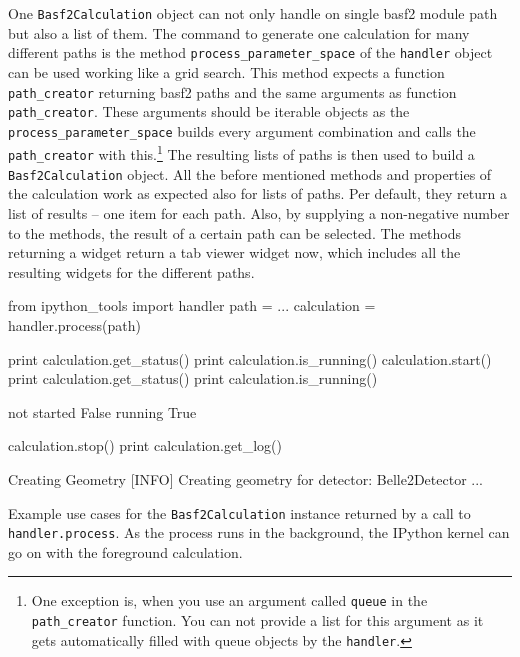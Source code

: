 One \texttt{Basf2Calculation} object can not only handle on single basf2 module path but also a list of them. The command to generate one calculation for many different paths is the method \verb+process_parameter_space+ of the \texttt{handler} object can be used working like a grid search. This method expects a function \verb+path_creator+ returning basf2 paths and the same arguments as function \verb+path_creator+. These arguments should be iterable objects as the \verb+process_parameter_space+ builds every argument combination and calls the \verb+path_creator+ with this.\footnote{One exception is, when you use an argument called \texttt{queue} in the \texttt{path\_creator} function. You can not provide a list for this argument as it gets automatically filled with queue objects by the \texttt{handler}.} The resulting lists of paths is then used to build a \texttt{Basf2Calculation} object. All the before mentioned methods and properties of the calculation work as expected also for lists of paths. Per default, they return a list of results -- one item for each path. Also, by supplying a non-negative number to the methods, the result of a certain path can be selected. The methods returning a widget return a tab viewer widget now, which includes all the resulting widgets for the different paths.

\begin{listing}
\begin{inputipynb}
from ipython_tools import handler
path = ...
calculation = handler.process(path)
\end{inputipynb}
\begin{inputipynb}
print calculation.get_status()
print calculation.is_running()
calculation.start()
print calculation.get_status()
print calculation.is_running()
\end{inputipynb}
\begin{outputipynb}
not started
False
running
True
\end{outputipynb}
\begin{inputipynb}
calculation.stop()
print calculation.get_log()
\end{inputipynb}
\begin{outputipynb}[\theipythcntr]
[INFO] Creating Geometry
[INFO] Creating geometry for detector: Belle2Detector
...
\end{outputipynb}

  \caption[Example use cases for the Basf2Calculation objects.]{Example use cases for the \texttt{Basf2Calculation} instance returned by a call to \texttt{handler.process}. As the process runs in the background, the IPython kernel can go on with the foreground calculation.}
  \label{lis-calculation}
\end{listing}

